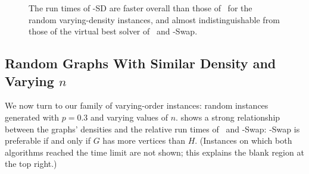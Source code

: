 \begin{figure}[h!]
    \centering
    \caption{The run times of \McSplit-SD are faster overall than those of \McSplit\ for the
        random varying-density instances, and almost indistinguishable from those of the virtual
        best solver of \McSplit\ and \McSplit-Swap.}
        \label{figure:left-vs-smart-d-mcis}
\end{figure}

\subsection{Random Graphs With Similar Density and Varying $n$}

We now turn to our family of varying-order instances: random instances
generated with $p=0.3$ and varying values of $n$.
 shows a strong relationship between the graphs'
densities and the relative run times of \McSplit\ and \McSplit-Swap: 
\McSplit-Swap
is preferable if and only if $G$ has more vertices than $H$.  (Instances on which both
algorithms reached the time limit are not shown; this explains the blank region
at the top right.)

